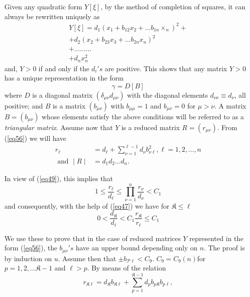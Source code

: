 Given any quadratic form $Y[\xi]$, by the method of completion of
squares, it can always be rewritten uniquely as  
\begin{gather*}
Y [ \xi ] = d_1 ( x_1 + b_{12} x_2 + \ldots b_{1 n }
\times_n )^2 + \\ 
+ d_2 ( x_2 + b_{2 3} x_3 + \ldots b_{2 n} x_n)^2 \\
+ \ldots \ldots \ldots \\
+  d_n x^2_n 
\end{gather*}
and, $Y > 0 $  if  and only if the $ d_i's$ are
positive. This shows that any matrix $Y > 0 $ has a unique
representation in the form  
\begin{equation*}
\gamma = D [ B ] \tag{56}\label{eq56} 
\end{equation*}
where  $D$ is a diagonal matrix $ ( \delta_{\mu \nu } d_{\mu \nu} ) $
with the  diagonal elements $ d_{\nu \nu } \equiv d_\nu $, all
positive; and  $B$ is a matrix $ (b_{\mu \nu} ) $ with $ b_{\mu
  \mu} = 1 $ and $ b_{ \mu \nu } = 0 $ for $ \mu > \nu $. A matrix
$ B = ( b_{\mu \nu }) $ whose elements satisfy the above conditions
will be referred to as a \textit{triangular matrix}. Assume now  that
$Y$ is a reduced matrix $ R = ( r_{\mu \nu })$. From (\ref{eq56}) we
will have  
\begin{align*}
r_\ell &= d_\ell + \sum^{\ell - 1}_{\nu = 1} d_\nu b^2_{\nu \ell},
\ell = 1,2, \ldots, n \\ 
\text{ and } \mid R \mid &=  d_1 d_2 \ldots  d_n . 
\end{align*}

In view of (\ref{eq49}), this implies that
\begin{equation*}
1 \leq \frac{r_\ell}{d_\ell} \leq \prod^n_{\nu = 1}
\frac{r_\nu}{d_\nu} < C_1 \tag{57}\label{eq57}  
\end{equation*}
and consequently, with the help of (\ref{eq47}) we have for $ \mathfrak{K}
\leq \ell $ 
\begin{equation*}
0 < \frac{d_\mathfrak{K}}{d_\ell} < C_1 \frac{r_\mathfrak{K}}{r_\ell}
\leq C_1 \tag{58}\label{eq58}  
\end{equation*}

We use these to prove that in the case of reduced matrices $Y$
represented in the form (\ref{eq56}), the $b_{\mu \nu}'s$
have an upper bound  depending  only on  $n$. The proof is by
induction on $u$. Assume then that $ \pm b_{\mathcal{P} \ell} <
C_9$. $C_9 = C_9 (n) $\pageoriginale for $p = 1,2, \ldots \mathfrak{K} -1$
and $\ell > p$. By means of the relation 
$$
r_{\mathfrak{K} \ell} = d_\mathfrak{K} b_{\mathfrak{K} \ell} +
\sum^{\mathfrak{K} - 1}_{p = 1} d_p
b_{p\mathfrak{K}} b_{p\ell}, 
$$

